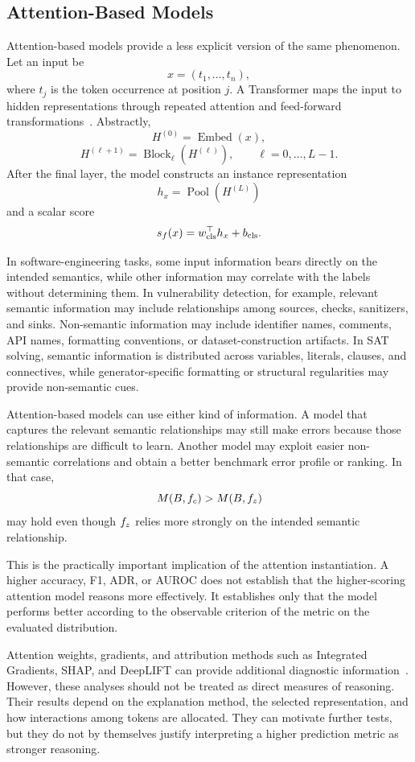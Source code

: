\documentclass[acmsmall,screen,review,anonymous]{acmart}
\begin{document}
\subsection{Attention-Based Models}
\label{sec:supp-attention-instantiation}

Attention-based models provide a less explicit version of the same
phenomenon. Let an input be
\[
x=(t_1,\ldots,t_n),
\]
where \(t_j\) is the token occurrence at position \(j\). A Transformer maps
the input to hidden representations through repeated attention and
feed-forward transformations~\cite{Vaswani2017Attention}. Abstractly,
\[
H^{(0)}=\operatorname{Embed}(x),
\]
\[
H^{(\ell+1)}
=
\operatorname{Block}_{\ell}(H^{(\ell)}),
\qquad
\ell=0,\ldots,L-1.
\]
After the final layer, the model constructs an instance representation
\[
h_x=\operatorname{Pool}(H^{(L)})
\]
and a scalar score
\[
s_{f}(x)
=
w_{\mathrm{cls}}^\top h_x+b_{\mathrm{cls}}.
\]

In software-engineering tasks, some input information bears directly on the
intended semantics, while other information may correlate with the labels
without determining them. In vulnerability detection, for example, relevant
semantic information may include relationships among sources, checks,
sanitizers, and sinks. Non-semantic information may include identifier names,
comments, API names, formatting conventions, or dataset-construction
artifacts. In SAT solving, semantic information is distributed across
variables, literals, clauses, and connectives, while generator-specific
formatting or structural regularities may provide non-semantic cues.

Attention-based models can use either kind of information. A model that
captures the relevant semantic relationships may still make errors because
those relationships are difficult to learn. Another model may exploit easier
non-semantic correlations and obtain a better benchmark error profile or
ranking. In that case,
\[
M(B,f_c)>M(B,f_z)
\]
may hold even though \(f_z\) relies more strongly on the intended
semantic relationship.

This is the practically important implication of the attention
instantiation. A higher accuracy, F1, ADR, or AUROC does not establish that
the higher-scoring attention model reasons more effectively. It establishes
only that the model performs better according to the observable criterion of
the metric on the evaluated distribution.

Attention weights, gradients, and attribution methods such as Integrated
Gradients, SHAP, and DeepLIFT can provide additional diagnostic
information~\cite{Sundararajan2017IG,LundbergLee2017SHAP,
Shrikumar2017DeepLIFT}. However, these analyses should not be treated as
direct measures of reasoning. Their results depend on the explanation method,
the selected representation, and how interactions among tokens are
allocated. They can motivate further tests, but they do not by themselves
justify interpreting a higher prediction metric as stronger reasoning.
\end{document}
